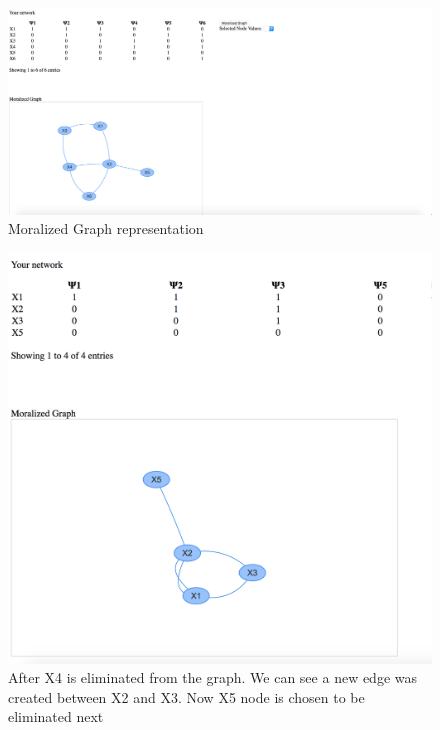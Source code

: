 \documentclass{article}
\begin{document}
    \begin{figure}[h!]
        \includegraphics[width=\linewidth]{img/moralized_graph.png}
        \caption{Moralized Graph representation}
        \label{fig:moralized_graph}
    \end{figure}

    \begin{figure}[h!]
        \includegraphics[width=\linewidth]{img/after_x4_elimination.png}
        \caption{After X4 is eliminated from the graph. We can see a new edge was created between X2 and X3. Now X5 node is chosen to be eliminated next}
        \label{fig:elimination}
    \end{figure}
\end{document}
